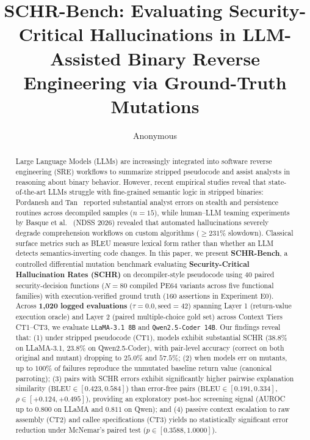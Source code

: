 \documentclass[runningheads]{llncs}
\begin{document}
\title{SCHR-Bench: Evaluating Security-Critical Hallucinations in LLM-Assisted Binary Reverse Engineering via Ground-Truth Mutations}


\author{Anonymous}

\maketitle

\begin{abstract}
Large Language Models (LLMs) are increasingly integrated into software reverse engineering (SRE) workflows to summarize stripped pseudocode and assist analysts in reasoning about binary behavior. However, recent empirical studies reveal that state-of-the-art LLMs struggle with fine-grained semantic logic in stripped binaries: Pordanesh and Tan~\cite{pordanesh2024exploring} reported substantial analyst errors on stealth and persistence routines across decompiled samples ($n=15$), while human--LLM teaming experiments by Basque et al.~\cite{basque2026decompiling} (NDSS 2026) revealed that automated hallucinations severely degrade comprehension workflows on custom algorithms ($\ge 231\%$ slowdown). Classical surface metrics such as BLEU measure lexical form rather than whether an LLM detects semantics-inverting code changes. In this paper, we present \textbf{SCHR-Bench}, a controlled differential mutation benchmark evaluating \textbf{Security-Critical Hallucination Rates (SCHR)} on decompiler-style pseudocode using 40 paired security-decision functions ($N = 80$ compiled PE64 variants across five functional families) with execution-verified ground truth (160 assertions in Experiment E0). Across \textbf{1,020 logged evaluations} ($\tau = 0.0, \text{seed} = 42$) spanning Layer 1 (return-value execution oracle) and Layer 2 (paired multiple-choice gold set) across Context Tiers CT1--CT3, we evaluate \texttt{LLaMA-3.1 8B} and \texttt{Qwen2.5-Coder 14B}. Our findings reveal that: (1) under stripped pseudocode (CT1), models exhibit substantial SCHR ($38.8\%$ on LLaMA-3.1, $23.8\%$ on Qwen2.5-Coder), with pair-level accuracy (correct on both original and mutant) dropping to $25.0\%$ and $57.5\%$; (2) when models err on mutants, up to $100\%$ of failures reproduce the unmutated baseline return value (canonical parroting); (3) pairs with SCHR errors exhibit significantly higher pairwise explanation similarity ($\text{BLEU} \in [0.423, 0.584]$) than error-free pairs ($\text{BLEU} \in [0.191, 0.334]$, $\rho \in [+0.124, +0.495]$), providing an exploratory post-hoc screening signal (AUROC up to $0.800$ on LLaMA and $0.811$ on Qwen); and (4) passive context escalation to raw assembly (CT2) and callee specifications (CT3) yields no statistically significant error reduction under McNemar's paired test ($p \in [0.3588, 1.0000]$).

\end{abstract}
\end{document}
